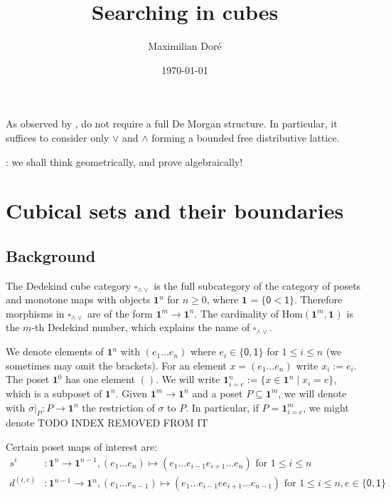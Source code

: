 \documentclass[11pt]{article}
\title{Searching in cubes}
\author{Maximilian Dor\'e}
\date{\today}
\theoremstyle{definition}
\newcommand{\mdef}{:=}
\newcommand{\join}{\wedge}
\newcommand{\meet}{\vee}
\newcommand{\dedekind}{\square_{\join \meet}}
\newcommand{\pint}[1]{\mathbf{1}^{#1}}
\newcommand{\pintrestr}[3]{\mathbf{1}^{#1}_{{#2}={#3}}}
\newcommand{\izero}{\mathsf{0}}
\newcommand{\ione}{\mathsf{1}}
\newcommand{\restrict}[2]{{#1}|_{#2}}
\renewcommand{\hom}[2]{\text{Hom}({#1} , {#2})}
\newcommand{\smap}[1]{s^{{#1}}}
\newcommand{\dmap}[2]{d^{({#1} , {#2})}}
\begin{document}
\maketitle	

As observed by \cite{orton17_axiom_model_cubic_type_theor_topos}, do not require
a full De Morgan structure. In particular, it suffices to consider only $\meet$
and $\join$ forming a bounded free distributive lattice.

\cite{williamson12_combin_homot_theor}: we shall think geometrically, and prove
algebraically!



\section{Cubical sets and their boundaries}

\subsection{Background}

The Dedekind cube category $\dedekind$ is the full subcategory of the category
of posets and monotone maps with objects $\pint{n}$ for $n \geq 0$, where $\pint{}
= \{ \izero < \ione \}$. Therefore morphisms in $\dedekind$ are of
the form $\pint{m} \to \pint{n}$. The cardinality of $\hom{\pint{m}}{\pint{}}$ is the
$m$-th Dedekind number, which explains the name of $\dedekind$.

We denote elements of $\pint{n}$ with $(e_1 \ldots e_n)$ where $e_i \in
\{\izero, \ione\}$ for $1 \leq i \leq n$ (we sometimes may omit the brackets).
For an element $x = (e_1 \ldots e_n)$ write $x_i \mdef e_i$. The poset
$\pint{0}$ has one element $()$. We will write $\pintrestr{n}{i}{e} \mdef
\{ x \in \pint{n} \mid x_i = e \}$, which is a subposet of $\pint{n}$. Given
$\pint{m} \to \pint{n}$ and a poset $P \subseteq \pint{m}$, we will denote with
$\restrict{\sigma}{P} : P \to \pint{n}$ the restriction of $\sigma$ to $P$.
In particular, if $P = \pintrestr{m}{i}{e}$, we might denote TODO INDEX REMOVED
FROM IT

Certain poset maps of interest are:
\begin{align*}
  \smap{i} &: \pint{n} \to \pint{n-1}, (e_1 \ldots e_n) \mapsto (e_1 \ldots e_{i-1} e_{i+1} \ldots e_n) \text{ for } 1 \leq i \leq n\\
  \dmap{i}{e} &: \pint{n-1} \to \pint{n}, 
      (e_1 \ldots e_{n-1}) \mapsto (e_1 \ldots e_{i-1} e e_{i+1} \ldots e_{n-1}) \text{ for } 1 \leq i \leq n, e \in \{\izero,\ione\}
\end{align*}
\end{document}
